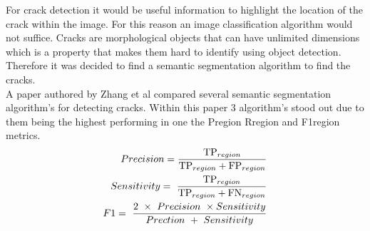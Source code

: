 \documentclass[11pt]{article}		%
\begin{document}
		For crack detection it would be useful information to highlight the location of the crack within the image.
		For this reason an image classification algorithm would not suffice. 
		Cracks are morphological objects that can have unlimited dimensions which is a property that makes them hard to identify using object detection. 
		Therefore it was decided to find a semantic segmentation algorithm to find the cracks.
		\\
        A paper authored by Zhang et al compared several semantic segmentation algorithm’s for detecting cracks. 
        Within this paper 3 algorithm’s stood out due to them being the highest performing in one the Pregion Rregion and F1region metrics.
        \begin{align}
        	Precision = \frac{{\rm TP}_{region}}{{\rm TP}_{region}+{\rm FP}_{region}}
        	\\
        	Sensitivity=\ \frac{{\rm TP}_{region}}{{\rm TP}_{region}+{\rm FN}_{region}}
        	\\
        	F1=\ \frac{2\ \times\ Precision\ \times Sensitivity}{Prection\ +\ Sensitivity}
        \end{align}
    
\end{document}
